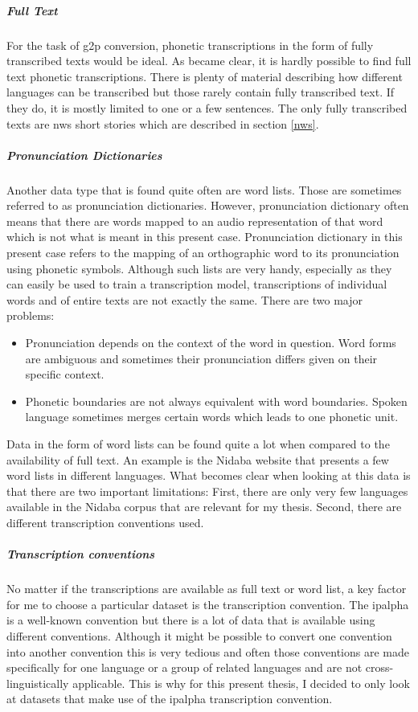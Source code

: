 \subparagraph{Full Text}
For the task of \ac{g2p} conversion, phonetic transcriptions in the form of fully transcribed texts would be ideal. As became clear, it is hardly possible to find full text phonetic transcriptions. There is plenty of material describing how different languages can be transcribed but those rarely contain fully transcribed text. If they do, it is mostly limited to one or a few sentences. The only fully transcribed texts are \ac{nws} short stories which are described in section \ref{nws}.

\subparagraph{Pronunciation Dictionaries}
Another data type that is found quite often are word lists. Those are sometimes referred to as pronunciation dictionaries. However, pronunciation dictionary often means that there are words mapped to an audio representation of that word which is not what is meant in this present case. Pronunciation dictionary in this present case refers to the mapping of an orthographic word to its pronunciation using phonetic symbols. Although such lists are very handy, especially as they can easily be used to train a transcription model, transcriptions of individual words and of entire texts are not exactly the same. There are two major problems:

\begin{itemize}
\item Pronunciation depends on the context of the word in question. Word forms are ambiguous and sometimes their pronunciation differs given on their specific context. 
\item Phonetic boundaries are not always equivalent with word boundaries. Spoken language sometimes merges certain words which leads to one phonetic unit.
\end{itemize} 

Data in the form of word lists can be found quite a lot when compared to the availability of full text. An example is the Nidaba website that presents a few word lists in different languages. What becomes clear when looking at this data is that there are two important limitations: First, there are only very few languages available in the Nidaba corpus that are relevant for my thesis. Second, there are different transcription conventions used.

\subparagraph{Transcription conventions}
No matter if the transcriptions are available as full text or word list, a key factor for me to choose a particular dataset is the transcription convention. The \ac{ipalpha} is a well-known convention but there is a lot of data that is available using different conventions. Although it might be possible to convert one convention into another convention this is very tedious and often those conventions are made specifically for one language or a group of related languages and are not cross-linguistically applicable. This is why for this present thesis, I decided to only look at datasets that make use of the \ac{ipalpha} transcription convention.

